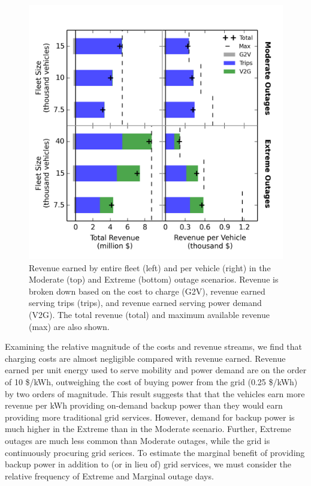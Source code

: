 \documentclass[journal]{IEEEtran}
\begin{document}
\begin{figure}[!htbp]
  \includegraphics[width=\linewidth]{plots/full_revenue_barchart.png}
  \caption{Revenue earned by entire fleet (left) and per vehicle (right) in the Moderate (top) and Extreme (bottom) outage scenarios. Revenue is broken down based on the cost to charge (G2V), revenue earned serving trips (trips), and revenue earned serving power demand (V2G). The total revenue (total) and maximum available revenue (max) are also shown.}
  \label{fig:revenue_bar}
\end{figure}

Examining the relative magnitude of the costs and revenue streams, we find that charging costs are almost negligible compared with revenue earned. Revenue earned per unit energy used to serve mobility and power demand are on the order of 10 \$/kWh, outweighing the cost of buying power from the grid (0.25 \$/kWh) by two orders of magnitude. This result suggests that that the vehicles earn more revenue per kWh providing on-demand backup power than they would earn providing more traditional grid services. However, demand for backup power is much higher in the Extreme than in the Moderate scenario. Further, Extreme outages are much less common than Moderate outages, while the grid is continuously procuring grid serices. To estimate the marginal benefit of providing backup power in addition to (or in lieu of) grid services, we must consider the relative frequency of Extreme and Marginal outage days.
\end{document}
